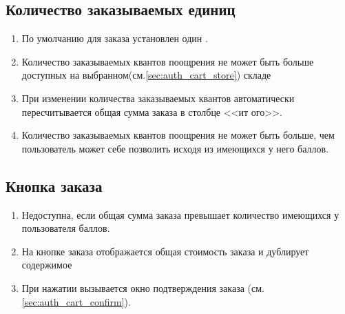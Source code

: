         \subsection{Количество заказываемых единиц}
            \begin{enumerate}
                \item По умолчанию для заказа установлен один .
                \item Количество заказываемых квантов поощрения не может быть
                больше доступных на выбранном(см.\ref{sec:auth_cart_store}) 
                складе
                \item При изменении количества заказываемых квантов
                автоматически пересчитывается общая сумма заказа в столбце <<ит
                ого>>.  \item Количество заказываемых квантов поощрения не 
                может быть больше, чем пользователь может себе позволить 
                исходя из имеющихся у него баллов.
            \end{enumerate}
            
        \subsection{Кнопка заказа}

            \begin{enumerate}
                \item Недоступна, если общая сумма заказа превышает количество
                имеющихся у пользователя баллов.
                \item На кнопке заказа отображается общая стоимость заказа и
                дублирует содержимое 
                \item При нажатии вызывается окно подтверждения заказа
                (см.\ref{sec:auth_cart_confirm}).
            \end{enumerate}

